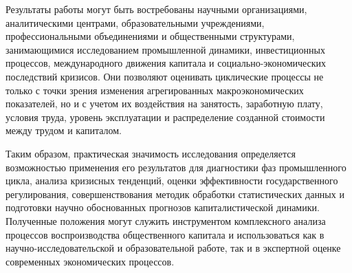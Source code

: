 Результаты работы могут быть востребованы научными организациями, аналитическими центрами, образовательными учреждениями, профессиональными объединениями и общественными структурами, занимающимися исследованием промышленной динамики, инвестиционных процессов, международного движения капитала и социально-экономических последствий кризисов. Они позволяют оценивать циклические процессы не только с точки зрения изменения агрегированных макроэкономических показателей, но и с учетом их воздействия на занятость, заработную плату, условия труда, уровень эксплуатации и распределение созданной стоимости между трудом и капиталом.

Таким образом, практическая значимость исследования определяется возможностью применения его результатов для диагностики фаз промышленного цикла, анализа кризисных тенденций, оценки эффективности государственного регулирования, совершенствования методик обработки статистических данных и подготовки научно обоснованных прогнозов капиталистической динамики. Полученные положения могут служить инструментом комплексного анализа процессов воспроизводства общественного капитала и использоваться как в научно-исследовательской и образовательной работе, так и в экспертной оценке современных экономических процессов.

